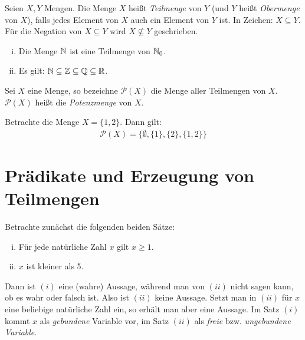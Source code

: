 \begin{mydef}
    Seien $X,Y$ Mengen. Die Menge $X$ heißt \textit{Teilmenge} von $Y$ (und $Y$ heißt \textit{Obermenge} von $X$), 
    falls jedes Element von $X$ auch ein Element von $Y$ ist. In Zeichen: $X \subseteq Y$. Für die  Negation von $X \subseteq Y$ wird 
    $X \nsubseteq Y$ geschrieben. 
\end{mydef}

\begin{example}
    \begin{enumerate}[(i)]
        \item 
        Die Menge $\mathbb{N}$ ist eine Teilmenge von $\mathbb{N}_0$. 
        \item 
        Es gilt: $\mathbb{N} \subseteq \mathbb{Z} \subseteq \mathbb{Q} \subseteq \mathbb{R}$. 
    \end{enumerate}
\end{example}

\begin{mydef}
    Sei $X$ eine Menge, so bezeichne  $\mathcal{P}(X)$ die Menge aller Teilmengen von $X$. 
    $\mathcal{P}(X)$ heißt die \textit{Potenzmenge} von $X$. 
\end{mydef}

\begin{example}
    Betrachte die Menge $X = \{1,2\}$. Dann gilt: 
    \begin{align*}
        \mathcal{P}(X) = \{\emptyset, \{1\}, \{2\}, \{1,2\}\}
    \end{align*}
\end{example}


\section{Prädikate und Erzeugung von Teilmengen}

Betrachte zunächst die folgenden beiden Sätze: 
\begin{enumerate}[(i)]
    \item 
    Für jede natürliche Zahl $x$ gilt $x \geq 1$. 
    \item 
    $x$ ist kleiner als 5.
\end{enumerate}

Dann ist $(i)$ eine (wahre) Aussage, während man von $(ii)$ nicht sagen kann, ob es wahr oder falsch ist. Also ist $(ii)$ keine Aussage. 
Setzt man in $(ii)$ für $x$ eine beliebige natürliche Zahl ein, so erhält man aber eine Aussage. Im Satz $(i)$ kommt $x$ als \textit{gebundene} Variable vor, 
im Satz $(ii)$ als \textit{freie} bzw. \textit{ungebundene Variable}. 

